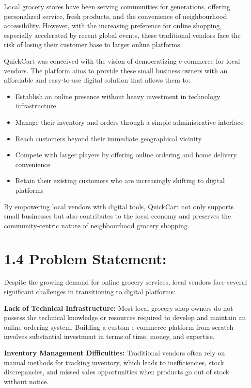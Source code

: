 \documentclass[12pt,a4paper]{report}
\begin{document}
Local grocery stores have been serving communities for generations, offering personalized service, fresh products, and the convenience of neighbourhood accessibility. However, with the increasing preference for online shopping, especially accelerated by recent global events, these traditional vendors face the risk of losing their customer base to larger online platforms.

QuickCart was conceived with the vision of democratizing e-commerce for local vendors. The platform aims to provide these small business owners with an affordable and easy-to-use digital solution that allows them to:

\begin{itemize}
    \item Establish an online presence without heavy investment in technology infrastructure
    \item Manage their inventory and orders through a simple administrative interface
    \item Reach customers beyond their immediate geographical vicinity
    \item Compete with larger players by offering online ordering and home delivery convenience
    \item Retain their existing customers who are increasingly shifting to digital platforms
\end{itemize}

By empowering local vendors with digital tools, QuickCart not only supports small businesses but also contributes to the local economy and preserves the community-centric nature of neighbourhood grocery shopping.

\section*{1.4 Problem Statement:}

Despite the growing demand for online grocery services, local vendors face several significant challenges in transitioning to digital platforms:

\textbf{Lack of Technical Infrastructure:} Most local grocery shop owners do not possess the technical knowledge or resources required to develop and maintain an online ordering system. Building a custom e-commerce platform from scratch involves substantial investment in terms of time, money, and expertise.

\textbf{Inventory Management Difficulties:} Traditional vendors often rely on manual methods for tracking inventory, which leads to inefficiencies, stock discrepancies, and missed sales opportunities when products go out of stock without notice.
\end{document}
